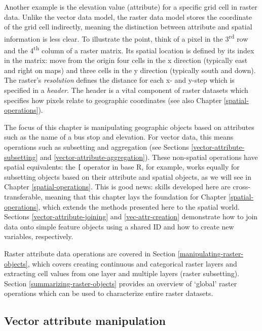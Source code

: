 \documentclass[]{krantz}
\begin{document}
Another example is the elevation value (attribute) for a specific grid cell in raster data.
Unlike the vector data model, the raster data model stores the coordinate of the grid cell indirectly, meaning the distinction between attribute and spatial information is less clear.
To illustrate the point, think of a pixel in the 3\textsuperscript{rd} row and the 4\textsuperscript{th} column of a raster matrix.
Its spatial location is defined by its index in the matrix: move from the origin four cells in the x direction (typically east and right on maps) and three cells in the y direction (typically south and down).
The raster's \emph{resolution} defines the distance for each x- and y-step which is specified in a \emph{header}.
The header is a vital component of raster datasets which specifies how pixels relate to geographic coordinates (see also Chapter \ref{spatial-operations}).

The focus of this chapter is manipulating geographic objects based on attributes such as the name of a bus stop and elevation.
For vector data, this means operations such as subsetting and aggregation (see Sections \ref{vector-attribute-subsetting} and \ref{vector-attribute-aggregation}).
These non-spatial operations have spatial equivalents:
the \texttt{{[}} operator in base R, for example, works equally for subsetting objects based on their attribute and spatial objects, as we will see in Chapter \ref{spatial-operations}.
This is good news: skills developed here are cross-transferable, meaning that this chapter lays the foundation for Chapter \ref{spatial-operations}, which extends the methods presented here to the spatial world.
Sections \ref{vector-attribute-joining} and \ref{vec-attr-creation} demonstrate how to join data onto simple feature objects using a shared ID and how to create new variables, respectively.

Raster attribute data operations are covered in Section \ref{manipulating-raster-objects}, which covers creating continuous and categorical raster layers and extracting cell values from one layer and multiple layers (raster subsetting).
Section \ref{summarizing-raster-objects} provides an overview of `global' raster operations which can be used to characterize entire raster datasets.

\hypertarget{vector-attribute-manipulation}{%
\subsection{Vector attribute manipulation}\label{vector-attribute-manipulation}}
\end{document}
